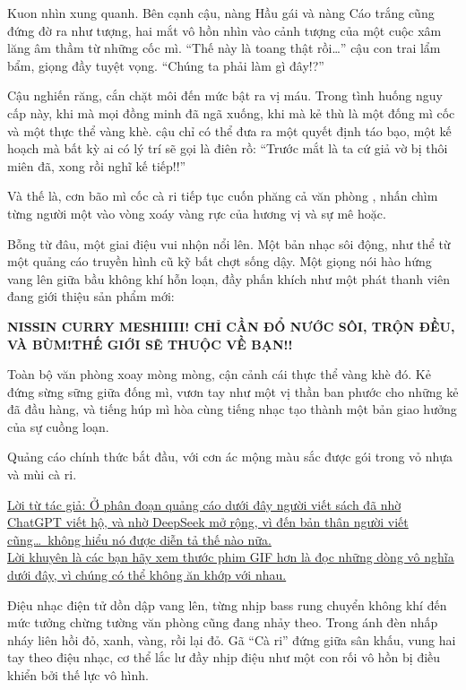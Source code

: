 \documentclass[../main.tex]{subfiles}
\begin{document}
Kuon nhìn xung quanh. Bên cạnh cậu, nàng Hầu gái và nàng Cáo trắng cũng đứng đờ ra như tượng, hai mắt vô hồn nhìn vào cảnh tượng của một cuộc xâm lăng âm thầm từ những cốc mì. ``Thế này là toang thật rồi\dots'' cậu con trai lẩm bẩm, giọng đầy tuyệt vọng. ``Chúng ta phải làm gì đây!?''

Cậu nghiến răng, cắn chặt môi đến mức bật ra vị máu. Trong tình huống nguy cấp này, khi mà mọi đồng minh đã ngã xuống, khi mà kẻ thù là một đống mì cốc và một thực thể vàng khè. cậu chỉ có thể đưa ra một quyết định táo bạo, một kế hoạch mà bất kỳ ai có lý trí sẽ gọi là điên rồ: ``Trước mắt là ta cứ giả vờ bị thôi miên đã, xong rồi nghĩ kế tiếp!!''

Và thế là, cơn bão mì cốc cà ri tiếp tục cuốn phăng cả văn phòng \hll, nhấn chìm từng người một vào vòng xoáy vàng rực của hương vị và sự mê hoặc.

Bỗng từ đâu, một giai điệu vui nhộn nổi lên. Một bản nhạc sôi động, như thể từ một quảng cáo truyền hình cũ kỹ bất chợt sống dậy. Một giọng nói hào hứng vang lên giữa bầu không khí hỗn loạn, đầy phấn khích như một phát thanh viên đang giới thiệu sản phẩm mới:

\begin{center}
  {\textbf{NISSIN CURRY MESHIIII! CHỈ CẦN ĐỔ NƯỚC SÔI, TRỘN ĐỀU, VÀ BÙM! THẾ GIỚI SẼ THUỘC VỀ BẠN!!}}
\end{center}

Toàn bộ văn phòng xoay mòng mòng, cận cảnh cái thực thể vàng khè đó. Kẻ đứng sừng sững giữa đống mì, vươn tay như một vị thần ban phước cho những kẻ đã đầu hàng, và tiếng húp mì hòa cùng tiếng nhạc tạo thành một bản giao hưởng của sự cuồng loạn.


Quảng cáo chính thức bắt đầu, với cơn ác mộng màu sắc được gói trong vỏ nhựa và mùi cà ri.

\begin{center}
  \uline{Lời từ tác giả: Ở phân đoạn quảng cáo dưới đây người viết sách đã nhờ ChatGPT viết hộ, và nhờ DeepSeek mở rộng, vì đến bản thân người viết cũng\dots\ không hiểu nó được diễn tả thế nào nữa.\\Lời khuyên là các bạn hãy xem thước phim GIF hơn là đọc những dòng vô nghĩa dưới đây, vì chúng có thể không ăn khớp với nhau.}
\end{center}

\il


Điệu nhạc điện tử dồn dập vang lên, từng nhịp bass rung chuyển không khí đến mức tưởng chừng tường văn phòng cũng đang nhảy theo. Trong ánh đèn nhấp nháy liên hồi đỏ, xanh, vàng, rồi lại đỏ. Gã ``Cà ri'' đứng giữa sân khấu, vung hai tay theo điệu nhạc, cơ thể lắc lư đầy nhịp điệu như một con rối vô hồn bị điều khiển bởi thế lực vô hình.
\end{document}

